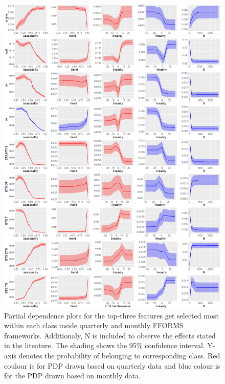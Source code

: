 \documentclass[11pt,a4paper,]{article}
\begin{document}
\newpage

\begin{figure}
\centering
\includegraphics{figures/pdpquarterly1-1.png}
\caption{\label{fig:pdpquarterly1}Partial dependence plots for the top-three
features get selected most within each class inside quarterly and
monthly FFORMS frameworks. Additionaly, N is included to observe the
effects stated in the liteature. The shading shows the 95\% confidence
interval. Y-axis denotes the probability of belonging to corresponding
class. Red coulour is for PDP drawn based on quarterly data and blue
colour is for the PDP drawn based on monthly data.}
\end{figure}

\newpage
\end{document}
